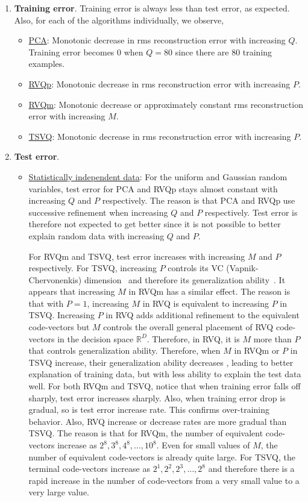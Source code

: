 \begin{enumerate}
\item \textbf{Training error}. Training error is always less than test error, as expected. Also, for each of the algorithms individually, we observe,
\begin{itemize}
\item \underline{PCA}: Monotonic decrease in rms reconstruction error with increasing $Q$. Training error becomes 0 when $Q=80$ since there are 80 training examples.
\item \underline{RVQp}: Monotonic decrease in rms reconstruction error with increasing $P$.
\item \underline{RVQm}: Monotonic decrease or approximately constant rms reconstruction error with increasing $M$.
\item \underline{TSVQ}: Monotonic decrease in rms reconstruction error with increasing $P$.
\end{itemize}
\item \textbf{Test error}.
\begin{itemize}
\item \underline{Statistically independent data}: For the uniform and Gaussian random variables, test error for PCA and RVQp stays almost constant with increasing $Q$ and $P$ respectively.  The reason is that PCA and RVQp use successive refinement when increasing $Q$ and $P$ respectively.  Test error is therefore not expected to get better since it is not possible to better explain random data with increasing $Q$ and $P$.

For RVQm and TSVQ, test error increases with increasing $M$ and $P$ respectively.  For TSVQ, increasing $P$ controls its VC (Vapnik-Chervonenkis) dimension~\cite{1999_BOOK_PRML_Vapnik} and therefore its generalization ability~\cite{2003_JNL_PRML_Karacali}.  It appears that increasing $M$ in RVQm has a similar effect.  The reason is that with $P=1$, increasing $M$ in RVQ is equivalent to increasing $P$ in TSVQ.  Increasing $P$ in RVQ adds additional refinement to the equivalent code-vectors but $M$ controls the overall general placement of RVQ code-vectors in the decision space $\mathbb{R}^D$.  Therefore, in RVQ, it is $M$ more than $P$ that controls generalization ability.  Therefore, when $M$ in RVQm or $P$ in TSVQ increase, their generalization ability decreases , leading to better explanation of training data, but with less ability to explain the test data well. For both RVQm and TSVQ, notice that when training error falls off sharply, test error increases sharply. Also, when training error drop is gradual, so is test error increase rate. This confirms over-training behavior. Also, RVQ increase or decrease rates are more gradual than TSVQ.  The reason is that for RVQm, the number of equivalent code-vectors increase as $2^8, 3^8, 4^8, \ldots, 10^8$.  Even for small values of $M$, the number of equivalent code-vectors is already quite large.  For TSVQ, the terminal code-vectors increase as $2^1, 2^2, 2^3, \ldots, 2^8$ and therefore there is a rapid increase in the number of code-vectors from a very small value to a very large value.


\end{itemize}
\end{enumerate}

